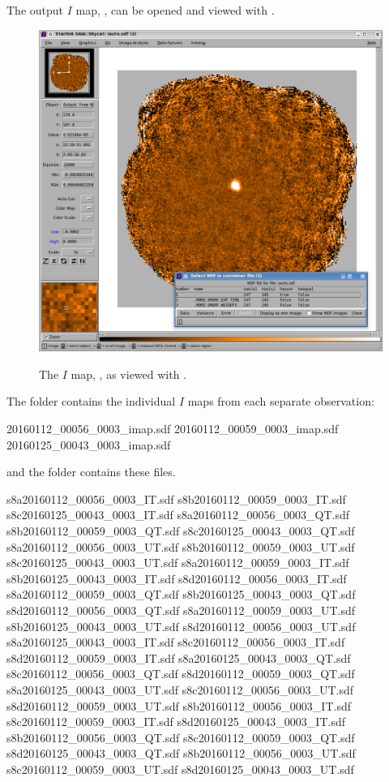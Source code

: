 The output $I$ map, , can be opened and viewed with \GAIA.

\begin{figure}[t!]
\begin{center}
\includegraphics[width=0.8\linewidth]{sc22-gaia-view-iauto.png}
\label{fig:gaia-iauto}
\caption [I map in GAIA]{
  \small The $I$ map, , as viewed with \GAIA.
}
\end{center}
\end{figure}

The  folder contains the individual $I$ maps from each separate
observation:

\begin{terminalv}
20160112_00056_0003_imap.sdf  20160112_00059_0003_imap.sdf  20160125_00043_0003_imap.sdf
\end{terminalv}

and the  folder contains these files.

\begin{terminalv}
s8a20160112_00056_0003_IT.sdf  s8b20160112_00059_0003_IT.sdf  s8c20160125_00043_0003_IT.sdf
s8a20160112_00056_0003_QT.sdf  s8b20160112_00059_0003_QT.sdf  s8c20160125_00043_0003_QT.sdf
s8a20160112_00056_0003_UT.sdf  s8b20160112_00059_0003_UT.sdf  s8c20160125_00043_0003_UT.sdf
s8a20160112_00059_0003_IT.sdf  s8b20160125_00043_0003_IT.sdf  s8d20160112_00056_0003_IT.sdf
s8a20160112_00059_0003_QT.sdf  s8b20160125_00043_0003_QT.sdf  s8d20160112_00056_0003_QT.sdf
s8a20160112_00059_0003_UT.sdf  s8b20160125_00043_0003_UT.sdf  s8d20160112_00056_0003_UT.sdf
s8a20160125_00043_0003_IT.sdf  s8c20160112_00056_0003_IT.sdf  s8d20160112_00059_0003_IT.sdf
s8a20160125_00043_0003_QT.sdf  s8c20160112_00056_0003_QT.sdf  s8d20160112_00059_0003_QT.sdf
s8a20160125_00043_0003_UT.sdf  s8c20160112_00056_0003_UT.sdf  s8d20160112_00059_0003_UT.sdf
s8b20160112_00056_0003_IT.sdf  s8c20160112_00059_0003_IT.sdf  s8d20160125_00043_0003_IT.sdf
s8b20160112_00056_0003_QT.sdf  s8c20160112_00059_0003_QT.sdf  s8d20160125_00043_0003_QT.sdf
s8b20160112_00056_0003_UT.sdf  s8c20160112_00059_0003_UT.sdf  s8d20160125_00043_0003_UT.sdf
\end{terminalv}


